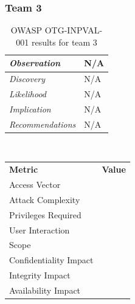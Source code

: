 \documentclass[headsepline,footsepline,footinclude=false,oneside,fontsize=11pt,paper=a4,listof=totoc,bibliography=totoc]{scrbook} %
\begin{document}
\subsubsection{Team 3}

\begin{table}[H]
	\centering
	\begin{tabular}{l p{11cm}} 
		\textit{Observation} &  N/A\\ 
		\hline
		\textit{Discovery} &  N/A \\
		\hline
		\textit{Likelihood} & N/A\\
		\hline
		\textit{Implication} & N/A\\
		\hline
		\textit{Recommendations} & N/A\\ 
	\end{tabular}
	\caption{OWASP OTG-INPVAL-001 results for team 3}
	\label{table:scenario2}
\end{table} 
\
\vspace{0.5cm}
\
\begin{center}
	\begin{tabular}{ll}
		\rowcolor[HTML]{34CDF9} 
		{\color[HTML]{ECF4FF} \textbf{Metric}}        & {\color[HTML]{ECF4FF} \textbf{Value}} \\
		\rowcolor[HTML]{BBDAFF} 
		{\color[HTML]{333333} Access Vector}          & {\color[HTML]{333333} }               \\
		\rowcolor[HTML]{ECF4FF} 
		{\color[HTML]{333333} Attack Complexity}      & {\color[HTML]{333333} }               \\
		\rowcolor[HTML]{BBDAFF} 
		{\color[HTML]{333333} Privileges Required}    & {\color[HTML]{333333} }               \\
		\rowcolor[HTML]{ECF4FF} 
		{\color[HTML]{333333} User Interaction}       & {\color[HTML]{333333} }               \\
		\rowcolor[HTML]{BBDAFF} 
		{\color[HTML]{333333} Scope}                  & {\color[HTML]{333333} }               \\
		\rowcolor[HTML]{ECF4FF} 
		{\color[HTML]{333333} Confidentiality Impact} & {\color[HTML]{333333} }               \\
		\rowcolor[HTML]{BBDAFF} 
		{\color[HTML]{333333} Integrity Impact}       & {\color[HTML]{333333} }               \\
		\rowcolor[HTML]{ECF4FF} 
		{\color[HTML]{333333} Availability Impact}    & {\color[HTML]{333333} }              
	\end{tabular}
\end{center}
\end{document}

